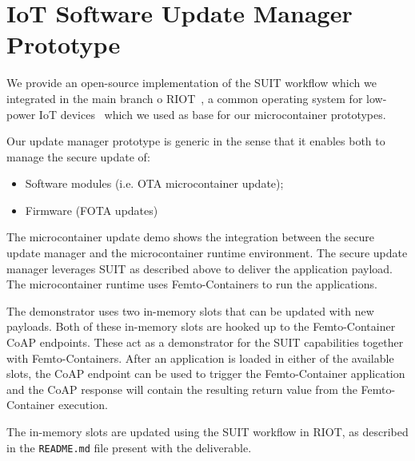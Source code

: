 \documentclass[../main.tex]{subfiles}
\begin{document}
	
\section{IoT Software Update Manager Prototype}

We provide an open-source implementation of the SUIT workflow which we integrated in the main branch o RIOT~\cite{RIOT-suit}, a common operating system for low-power IoT devices~\cite{baccelli2018riot} which we used as base for our  microcontainer prototypes.

Our update manager prototype is generic in the sense that it enables both to manage the secure update of:
\begin{itemize}
    \item Software modules (i.e. OTA microcontainer update);
    \item Firmware (FOTA updates)
\end{itemize}

The microcontainer update demo shows the integration between the secure update
manager and the microcontainer runtime environment.
The secure update manager leverages SUIT as described above to deliver the
application payload.
The microcontainer runtime uses Femto-Containers to run the applications.

The demonstrator uses two in-memory slots that can be updated with new payloads.
Both of these in-memory slots are hooked up to the Femto-Container CoAP
endpoints. These act as a demonstrator for the SUIT capabilities together with
Femto-Containers. After an application is loaded in either of the available
slots, the CoAP endpoint can be used to trigger the Femto-Container application
and the CoAP response will contain the resulting return value from the
Femto-Container execution.

The in-memory slots are updated using the SUIT workflow in RIOT, as described in
the \texttt{README.md} file present with the deliverable.
\end{document}
